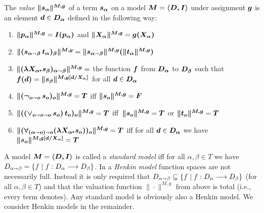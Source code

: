 \begin{definition}\label{holvalue}
  The \emph{value} $\boldsymbol{\| s_\alpha\|^{M,g}}$ of a \HOL term
  $\boldsymbol{s_\alpha}$ on a model $\boldsymbol{M}=\boldsymbol{\langle D, I \rangle}$ under assignment $\boldsymbol{g}$ is an element $\boldsymbol{d}\in \boldsymbol{D_\alpha}$
  defined in the following way:
\begin{enumerate}
\item $\boldsymbol{\|p_\alpha\|^{M,g}} = \boldsymbol{I(p_\alpha)}$ and $\boldsymbol{\|X_\alpha\|^{M,g}} = \boldsymbol{g(X_\alpha)}$
\item $\boldsymbol{\|(s_{\alpha\shortrightarrow\beta}\, t_\alpha)_\beta\|^{M,g}} = \boldsymbol{\|s_{\alpha\shortrightarrow\beta}\|^{M,g}(\|t_\alpha\|^{M,g})}$
\item $\hol{\|(\lam{X_\alpha}s_\beta)_{\alpha\ar\beta}\|^{M,g}} = $
  the function $\boldsymbol{f}$ from $\boldsymbol{D_\alpha}$ to $\boldsymbol{D_\beta}$ such
  that $\boldsymbol{f(d)} = \boldsymbol{\|s_\beta\|^{M,g[d/X_\alpha]}}$ for all
  $\boldsymbol{d}\in \boldsymbol{D_\alpha}$
\item $\boldsymbol{\|(\neg_{o\shortrightarrow o}\, s_o)_o\|^{M,g}} = \boldsymbol{T}$ iff $\boldsymbol{\|s_o\|^{M,g}} = \boldsymbol{F}$
\item $\boldsymbol{\|(({\vee_{o\shortrightarrow o\shortrightarrow o}}\,s_o)\,t_o)_o\|^{M,g}} =
  \boldsymbol{T}$ iff\, $\boldsymbol{\|s_o\|^{M,g}} = \boldsymbol{T}$ or $\boldsymbol{\|t_o\|^{M,g}}
  = \boldsymbol{T}$
\item $\hol{\|(\forall_{(\alpha\ar o)\ar o}(\lam{X_\alpha}
    s_o))_o\|^{M,g}} = \hol{T}$ iff for all $\boldsymbol{d}\in
  \boldsymbol{D_\alpha}$ we have $\boldsymbol{\|s_o\|^{M,g[d/X_\alpha]}} = \boldsymbol{T}$
\end{enumerate}
\end{definition}


\begin{definition}\label{homlhenkinmodel}
 A model $\boldsymbol{M}=\boldsymbol{\langle D, I \rangle}$ is called a
 \emph{standard model} iff for all $\alpha,\beta\in T$ we have
 $D_{\alpha\shortrightarrow\beta} = \{ f \mid f : D_\alpha \longrightarrow D_\beta
 \}$. In a \emph{Henkin model} function spaces are not necessarily
 full. Instead it is only required that $D_{\alpha\shortrightarrow\beta}
 \subseteq \{ f \mid f : D_\alpha \longrightarrow D_\beta \}$ (for all
 $\alpha,\beta\in T$) and that the valuation function 
 $\|\cdot\|^{M,g}$ from above is total (i.e., every term denotes). Any standard model is obviously
 also a Henkin model. We consider Henkin models in the remainder.
\end{definition}

